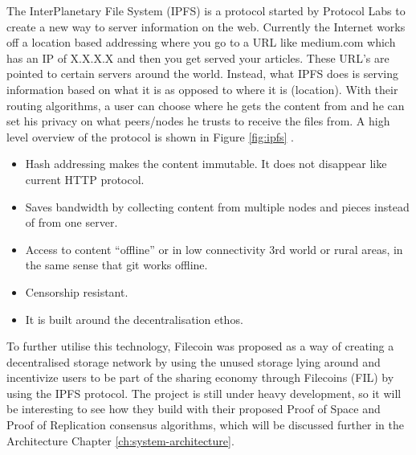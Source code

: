\begin{enumerate}
The InterPlanetary File System (IPFS)\cite{ipfslabs} is a protocol started by Protocol Labs to create a new way to server information on the web. Currently the Internet works off a location based addressing where you go to a URL like medium.com which has an IP of X.X.X.X and then you get served your articles. These URL’s are pointed to certain servers around the world. Instead, what IPFS does is serving information based on what it is as opposed to where it is (location). With their routing algorithms, a user can choose where he gets the content from and he can set his privacy on what peers/nodes he trusts to receive the files from. A high level overview of the protocol is shown in Figure \ref{fig:ipfs} \cite{ipfslabs}.

\begin{itemize}
    \item  Hash addressing makes the content immutable. It does not disappear like current HTTP protocol.
    \item Saves bandwidth by collecting content from multiple nodes and pieces instead of from one server.
    \item Access to content “offline” or in low connectivity 3rd world or rural areas, in the same sense that git works offline.
    \item Censorship resistant.
    \item It is built around the decentralisation ethos.

\end{itemize}

To further utilise this technology, Filecoin was proposed as a way of creating a decentralised storage network by using the unused storage lying around and incentivize users to be part of the sharing economy through Filecoins (FIL) by using the IPFS protocol. The project is still under heavy development, so it will be interesting to see how they build with their proposed Proof of Space and Proof of Replication consensus algorithms, which will be discussed further in the Architecture Chapter \ref{ch:system-architecture}. 
\end{enumerate}

